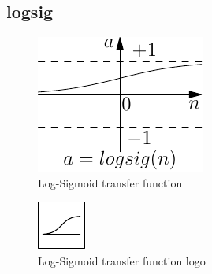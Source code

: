 \subsection{logsig}

\begin{figure}[htb]
\centering
  \includegraphics{octave/neuroPackage/graphics/logsig}
\caption{Log-Sigmoid transfer function}
\label{fig:logsigTransferFunction}
\end{figure}

\begin{figure}[htb]
\centering
  \includegraphics{octave/neuroPackage/graphics/logsiglogo}
\caption{Log-Sigmoid transfer function logo}
\label{fig:logsigTransferFunctionLogo}
\end{figure}